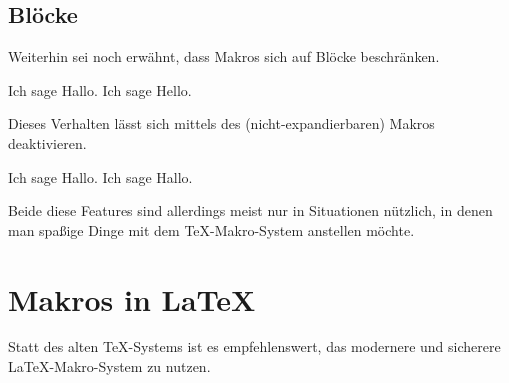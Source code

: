 \subsection{Blöcke}

Weiterhin sei noch erwähnt, dass Makros sich auf Blöcke beschränken.
\begin{latexlisting}
	\def\aaa{Hello}
	{
		\def\aaa{Hallo}
		Ich sage \aaa .
	}
	Ich sage \aaa .
\end{latexlisting}
Dieses Verhalten lässt sich mittels des (nicht-expandierbaren) Makros  deaktivieren.
\begin{latexlisting}
	\def\aaa{Hello}
	{
		\global\def\aaa{Hallo}
		Ich sage \aaa .
	}
	Ich sage \aaa .
\end{latexlisting}
Beide diese Features sind allerdings meist nur in Situationen nützlich, in denen man spaßige Dinge mit dem \TeX-Makro-System anstellen möchte.

\section{Makros in \LaTeX}

Statt des alten \TeX-Systems ist es empfehlenswert, das modernere und sicherere \LaTeX-Makro-System zu nutzen.

